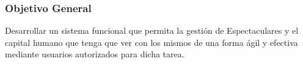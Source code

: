 \subsubsection{Objetivo General}
Desarrollar un sistema funcional que permita la gestión de Espectaculares y el capital humano que tenga que ver con los mismos de una forma ágil y efectiva mediante usuarios autorizados para dicha tarea.